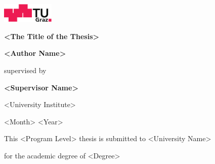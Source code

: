 
\begin{titlepage}
\begin{center}

\begin{sffamily}
\includegraphics[width=25mm]{images/TU_Graz_Logo}

\vfill

{\LARGE\bfseries
  <The Title of the Thesis>
}

\vfill

{\Large\bfseries
  <Author Name>
}

\vspace*{0.2cm}

supervised by

{\bfseries
  <Supervisor Name>
}

<University Institute>

<Month> <Year>


\vfill

This <Program Level> thesis is submitted to <University Name>

for the academic degree of <Degree>

\end{sffamily}
\end{center}
\end{titlepage}
\cleardoublepage
